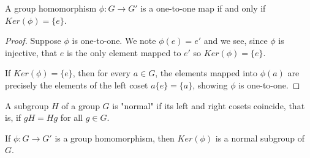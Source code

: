 \documentclass[a4paper,11pt]{article}
\begin{document}
\begin{outline}
    A group homomorphism \(\phi: G \rightarrow G'\) is a one-to-one map if and only if \(Ker(\phi) = \{e\}\).
    
    \begin{proof}
      \forward 
        Suppose \(\phi\) is one-to-one. We note \(\phi(e) = e'\) and we see, since \(\phi\) is injective, that
        \(e\) is the only element mapped to \(e'\) so \(Ker(\phi) = \{e\}\).
        
      \backward 
        If \(Ker(\phi) = \{e\}\), then for every \(a \in G\), the elements mapped into \(\phi(a)\) are precisely
        the elements of the left coset \(a\{e\} = \{a\}\), showing \(\phi\) is one-to-one.    
    \end{proof}
    
    A subgroup \(H\) of a group \(G\) is "normal" if its left and right cosets coincide, that is, if \(gH = Hg\) 
    for all \(g \in G\).
    
    If \(\phi: G \rightarrow G'\) is a group homomorphism, then \(Ker(\phi)\) is a normal subgroup of \(G\).

\end{outline}
\end{document}
